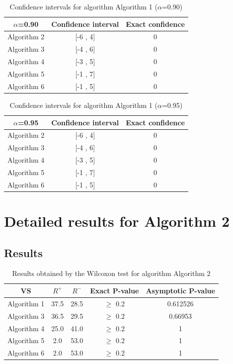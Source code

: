 \documentclass[a4paper,10pt]{article}
\begin{document}
\begin{table}[!htp]
\centering\small
\begin{tabular}{
|c|c|c|}
\hline
 $\alpha$=0.90 & Confidence interval & Exact confidence \\ \hline 
Algorithm 2 & [-6 , 4] & 0\\ \hline 
Algorithm 3 & [-4 , 6] & 0\\ \hline 
Algorithm 4 & [-3 , 5] & 0\\ \hline 
Algorithm 5 & [-1 , 7] & 0\\ \hline 
Algorithm 6 & [-1 , 5] & 0\\ \hline 

\end{tabular}
\caption{Confidence intervals for algorithm Algorithm 1 ($\alpha$=0.90)}
\end{table}
\begin{table}[!htp]
\centering\small
\begin{tabular}{
|c|c|c|}
\hline
 $\alpha$=0.95 & Confidence interval & Exact confidence \\ \hline 
Algorithm 2 & [-6 , 4] & 0\\ \hline 
Algorithm 3 & [-4 , 6] & 0\\ \hline 
Algorithm 4 & [-3 , 5] & 0\\ \hline 
Algorithm 5 & [-1 , 7] & 0\\ \hline 
Algorithm 6 & [-1 , 5] & 0\\ \hline 

\end{tabular}
\caption{Confidence intervals for algorithm Algorithm 1 ($\alpha$=0.95)}
\end{table}

 \clearpage 


\section{Detailed results for Algorithm 2}


\subsection{Results}

\begin{table}[!htp]
\centering\small
\begin{tabular}{
|c|c|c|c|c|}
\hline
 VS & $R^{+}$ & $R^{-}$ & Exact P-value & Asymptotic P-value \\ \hline 
Algorithm 1 & 37.5 & 28.5 & $\geq$ 0.2 & 0.612526\\ \hline 
Algorithm 3 & 36.5 & 29.5 & $\geq$ 0.2 & 0.66953\\ \hline 
Algorithm 4 & 25.0 & 41.0 & $\geq$ 0.2 & 1\\ \hline 
Algorithm 5 & 2.0 & 53.0 & $\geq$ 0.2 & 1\\ \hline 
Algorithm 6 & 2.0 & 53.0 & $\geq$ 0.2 & 1\\ \hline 

\end{tabular}
\caption{Results obtained by the Wilcoxon test for algorithm Algorithm 2}
\end{table}
\end{document}

